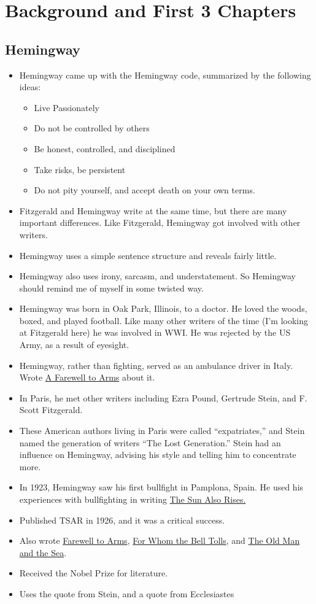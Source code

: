 \documentclass[11pt]{article}
\begin{document}
\section{Background and First 3 Chapters}
\subsection{Hemingway}
\begin{itemize}
	\item Hemingway came up with the Hemingway code, summarized by the following
		ideas:
		\begin{itemize}
			\item Live Passionately
			\item Do not be controlled by others
			\item Be honest, controlled, and disciplined
			\item Take risks, be persistent
			\item Do not pity yourself, and accept death on your own terms.
		\end{itemize}
	\item Fitzgerald and Hemingway write at the same time, but there are many 
		important differences.  Like Fitzgerald, Hemingway got involved with 
		other writers.
	\item Hemingway uses a simple sentence structure and reveals fairly little.
	\item Hemingway also uses irony, sarcasm, and understatement.  So 
		Hemingway should remind me of myself in some twisted way.
	\item Hemingway was born in Oak Park, Illinois, to a doctor.  He loved the 
		woods, boxed, and played football.  Like many other writers of the 
		time (I'm looking at Fitzgerald here) he was involved in WWI.  He was 
		rejected by the US Army, as a result of eyesight.
	\item Hemingway, rather than fighting, served as an ambulance driver in 
		Italy.  Wrote \underline{A Farewell to Arms} about it.  
	\item In Paris, he met other writers including Ezra Pound, Gertrude Stein, 
		and F. Scott Fitzgerald.
	\item These American authors living in Paris were called ``expatriates,'' 
		and Stein named the generation of writers ``The Lost Generation.'' 
		Stein had an influence on Hemingway, advising his style and telling 
		him to concentrate more.
	\item In 1923, Hemingway saw his first bullfight in Pamplona, Spain.  He 
		used his experiences with bullfighting in writing \underline{The Sun
		Also Rises.}
	\item Published TSAR in 1926, and it was a critical success.
	\item Also wrote \underline{Farewell to Arms}, \underline{For Whom the 
		Bell Tolls}, and \underline{The Old Man and the Sea}.
	\item Received the Nobel Prize for literature.
	\item Uses the quote from Stein, and a quote from Ecclesiastes
\end{itemize}
\end{document}
